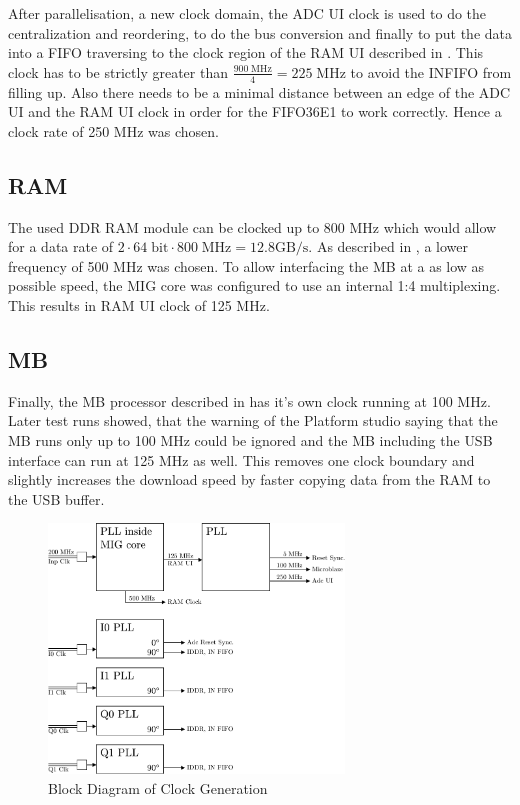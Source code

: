 After parallelisation, a new clock domain, the \gls{ADC} \gls{UI} clock
is used to do the centralization and reordering,
to do the bus conversion and finally to put the data into a \gls{FIFO}
traversing to the clock region of the \gls{RAM} \gls{UI} described
in . This clock has to be strictly greater than
$\frac{900\;\text{MHz}}{4} = 225\;\text{MHz}$ to avoid the
\gls{INFIFO} from filling up. Also there needs to be a minimal
distance between an edge of the \gls{ADC} \gls{UI} and the
\gls{RAM} \gls{UI} clock in order for the FIFO36E1 to work correctly.
Hence a clock rate of 250 MHz was chosen. \\

\subsection{\gls{RAM}}
\label{sec:fpga_clock_ram}
The used \gls{DDR} \gls{RAM} module can be clocked up to 800 MHz which would
allow for a data rate of
$2 \cdot 64\;\text{bit} \cdot 800\;\text{MHz} = 12.8 \text{GB} / \text{s}$.
As described in , a lower frequency of 500 MHz
was chosen. To allow interfacing the \gls{MB} at a as low as possible speed,
the \gls{MIG} core was configured to use an internal 1:4 multiplexing. This results
in \gls{RAM} \gls{UI} clock of 125 MHz.

\subsection{\acrfull{MB}}
Finally, the \gls{MB} processor described in  has
it's own clock running at 100 MHz. \\

Later test runs showed, that the warning of the Platform studio saying that the
\gls{MB} runs only up to 100 MHz could be ignored and the \gls{MB} including
the \gls{USB} interface can run at 125 MHz as well. This removes one clock boundary
and slightly increases the download speed by faster copying data from the
\gls{RAM} to the \gls{USB} buffer. \\

\begin{figure}
  \centering
  \includegraphics[width=0.7\textwidth]{figures/clock_generation}
  \caption{Block Diagram of Clock Generation}
  \label{fig:fpga_clock_generation}
\end{figure}

